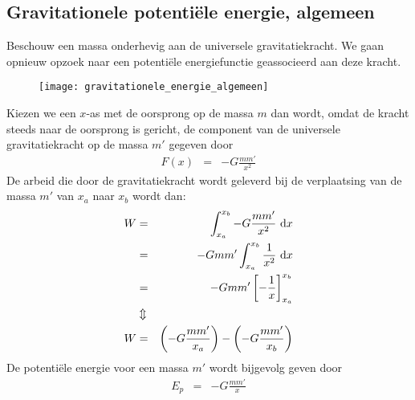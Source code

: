 \documentclass{ximera}
\begin{document}
	\author{Bart Lambregs}
    \xmsource


	\subsection{Gravitationele potenti\"ele energie, algemeen}\label{gravitationele potentiele energie alg}

	Beschouw een massa onderhevig aan de universele gravitatiekracht. We gaan opnieuw opzoek naar een potenti\"ele energiefunctie geassocieerd aan deze kracht.
	\begin{figure}[h]
	\begin{center}
	\texttt{[image: gravitationele\_energie\_algemeen]}
	\end{center}
	\end{figure}
	
	Kiezen we een $x$-as met de oorsprong op de massa $m$ dan wordt, omdat de kracht steeds naar de oorsprong is gericht, de component van de universele gravitatiekracht op de massa $m'$ gegeven door
	\begin{eqnarray*}
	F(x)&=&-G\frac{mm'}{x^2}
	\end{eqnarray*}
	De arbeid die door de gravitatiekracht wordt geleverd bij de verplaatsing van de massa $m'$ van $x_a$ naar $x_b$ wordt dan:
	\begin{eqnarray*}
	W&=&\int_{x_a}^{x_b}-G\frac{mm'}{x^2}~{\rm d}x\\
	&=&-Gmm'\int_{x_a}^{x_b}\frac{1}{x^2}~{\rm d}x\\
	&=&-Gmm'\left[-\frac{1}{x}\right]_{x_a}^{x_b}\\
	&\Updownarrow&\\
	W&=&\left(-G\frac{mm'}{x_a}\right)-\left(-G\frac{mm'}{x_b}\right)
	\end{eqnarray*}
	De potenti\"ele energie voor een massa $m'$ wordt bijgevolg geven
	door
	\begin{eqnarray}
	E_p&=&-G\frac{mm'}{x}\label{Ep=-Gmm'/x}
	\end{eqnarray}
	
\end{document}
